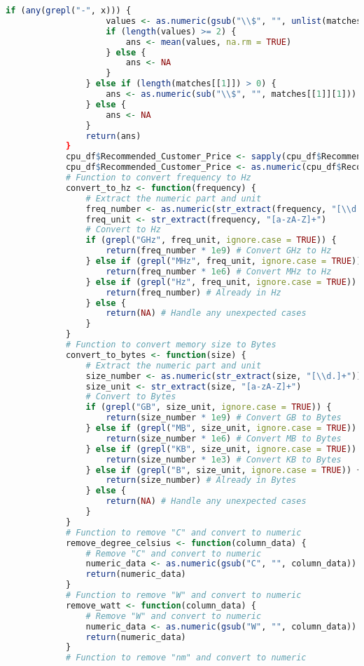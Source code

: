 \documentclass{article}
\begin{document}
\begin{itemize}
\begin{lstlisting}[language=R]
				if (any(grepl("-", x))) {
					values <- as.numeric(gsub("\\$", "", unlist(matches)))
					if (length(values) >= 2) {
						ans <- mean(values, na.rm = TRUE)
					} else {
						ans <- NA
					}
				} else if (length(matches[[1]]) > 0) {
					ans <- as.numeric(sub("\\$", "", matches[[1]][1]))
				} else {
					ans <- NA
				}
				return(ans)
			}
			cpu_df$Recommended_Customer_Price <- sapply(cpu_df$Recommended_Customer_Price, PriceProcessor)
			cpu_df$Recommended_Customer_Price <- as.numeric(cpu_df$Recommended_Customer_Price)
			# Function to convert frequency to Hz
			convert_to_hz <- function(frequency) {
				# Extract the numeric part and unit
				freq_number <- as.numeric(str_extract(frequency, "[\\d.]+"))
				freq_unit <- str_extract(frequency, "[a-zA-Z]+")
				# Convert to Hz
				if (grepl("GHz", freq_unit, ignore.case = TRUE)) {
					return(freq_number * 1e9) # Convert GHz to Hz
				} else if (grepl("MHz", freq_unit, ignore.case = TRUE)) {
					return(freq_number * 1e6) # Convert MHz to Hz
				} else if (grepl("Hz", freq_unit, ignore.case = TRUE)) {
					return(freq_number) # Already in Hz
				} else {
					return(NA) # Handle any unexpected cases
				}
			}
			# Function to convert memory size to Bytes
			convert_to_bytes <- function(size) {
				# Extract the numeric part and unit
				size_number <- as.numeric(str_extract(size, "[\\d.]+"))
				size_unit <- str_extract(size, "[a-zA-Z]+")
				# Convert to Bytes
				if (grepl("GB", size_unit, ignore.case = TRUE)) {
					return(size_number * 1e9) # Convert GB to Bytes
				} else if (grepl("MB", size_unit, ignore.case = TRUE)) {
					return(size_number * 1e6) # Convert MB to Bytes
				} else if (grepl("KB", size_unit, ignore.case = TRUE)) {
					return(size_number * 1e3) # Convert KB to Bytes
				} else if (grepl("B", size_unit, ignore.case = TRUE)) {
					return(size_number) # Already in Bytes
				} else {
					return(NA) # Handle any unexpected cases
				}
			}
			# Function to remove "C" and convert to numeric
			remove_degree_celsius <- function(column_data) {
				# Remove "C" and convert to numeric
				numeric_data <- as.numeric(gsub("C", "", column_data))
				return(numeric_data)
			}
			# Function to remove "W" and convert to numeric
			remove_watt <- function(column_data) {
				# Remove "W" and convert to numeric
				numeric_data <- as.numeric(gsub("W", "", column_data))
				return(numeric_data)
			}
			# Function to remove "nm" and convert to numeric

\end{lstlisting}
\end{itemize}
\end{document}
